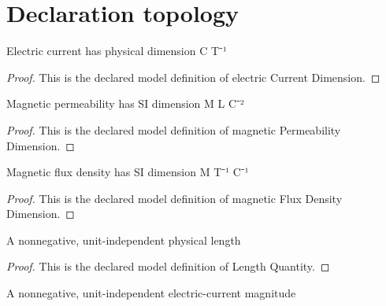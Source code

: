 \section{Declaration topology}
\begin{definition}
  \label{def:physics:phyx-mini-0964:phyxminiproblems-problemphyxmini0964-electriccurrentdimension}
  Electric current has physical dimension C T⁻¹
\end{definition}
\begin{proof}
  This is the declared model definition of electric Current Dimension.
\end{proof}
\begin{definition}
  \label{def:physics:phyx-mini-0964:phyxminiproblems-problemphyxmini0964-magneticpermeabilitydimension}
  Magnetic permeability has SI dimension M L C⁻²
\end{definition}
\begin{proof}
  This is the declared model definition of magnetic Permeability Dimension.
\end{proof}
\begin{definition}
  \label{def:physics:phyx-mini-0964:phyxminiproblems-problemphyxmini0964-magneticfluxdensitydimension}
  Magnetic flux density has SI dimension M T⁻¹ C⁻¹
\end{definition}
\begin{proof}
  This is the declared model definition of magnetic Flux Density Dimension.
\end{proof}
\begin{definition}
  \label{def:physics:phyx-mini-0964:phyxminiproblems-problemphyxmini0964-lengthquantity}
  A nonnegative, unit-independent physical length
\end{definition}
\begin{proof}
  This is the declared model definition of Length Quantity.
\end{proof}
\begin{definition}
  \label{def:physics:phyx-mini-0964:phyxminiproblems-problemphyxmini0964-electriccurrentmagnitude}
  A nonnegative, unit-independent electric-current magnitude
\end{definition}
